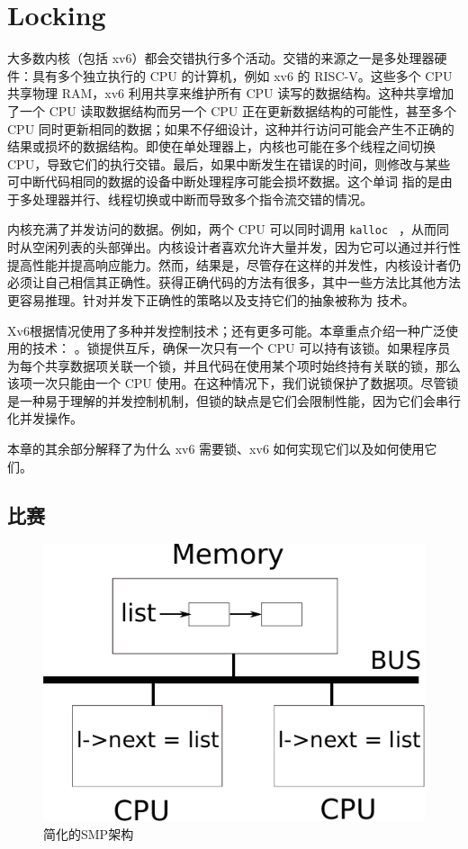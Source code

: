 \documentclass[UTF8]{article}
\begin{document}
   \chapter{Locking}   
    \label{CH:LOCK}     

大多数内核（包括 xv6）都会交错执行多个活动。交错的来源之一是多处理器硬件：具有多个独立执行的 CPU 的计算机，例如 xv6 的 RISC-V。这些多个 CPU 共享物理 RAM，xv6 利用共享来维护所有 CPU 读写的数据结构。这种共享增加了一个 CPU 读取数据结构而另一个 CPU 正在更新数据结构的可能性，甚至多个 CPU 同时更新相同的数据；如果不仔细设计，这种并行访问可能会产生不正确的结果或损坏的数据结构。即使在单处理器上，内核也可能在多个线程之间切换 CPU，导致它们的执行交错。最后，如果中断发生在错误的时间，则修改与某些可中断代码相同的数据的设备中断处理程序可能会损坏数据。这个单词
        指的是由于多处理器并行、线程切换或中断而导致多个指令流交错的情况。  

内核充满了并发访问的数据。例如，两个 CPU 可以同时调用  {    \tt    kalloc   }  ，从而同时从空闲列表的头部弹出。内核设计者喜欢允许大量并发，因为它可以通过并行性提高性能并提高响应能力。然而，结果是，尽管存在这样的并发性，内核设计者仍必须让自己相信其正确性。获得正确代码的方法有很多，其中一些方法比其他方法更容易推理。针对并发下正确性的策略以及支持它们的抽象被称为        技术。  

Xv6根据情况使用了多种并发控制技术；还有更多可能。本章重点介绍一种广泛使用的技术：      。锁提供互斥，确保一次只有一个 CPU 可以持有该锁。如果程序员为每个共享数据项关联一个锁，并且代码在使用某个项时始终持有关联的锁，那么该项一次只能由一个 CPU 使用。在这种情况下，我们说锁保护了数据项。尽管锁是一种易于理解的并发控制机制，但锁的缺点是它们会限制性能，因为它们会串行化并发操作。  

本章的其余部分解释了为什么 xv6 需要锁、xv6 如何实现它们以及如何使用它们。
    \section{比赛  }     

   \begin{figure}[t]
\center
\includegraphics[scale=0.8]{fig/smp.pdf}
\caption{简化的SMP架构  }
\label{fig:smp}
\end{figure}     
\end{document}
